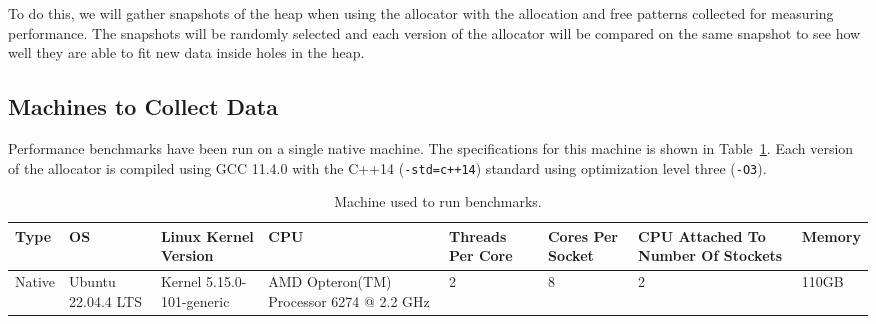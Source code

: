 To do this, we will gather snapshots of the heap when using the allocator with the allocation and free patterns collected for measuring performance. The snapshots will be randomly selected and each version of the allocator will be compared on the same snapshot to see how well they are able to fit new data inside holes in the heap.




\subsection{Machines to Collect Data}

Performance benchmarks have been run on a single native machine. The specifications for this machine is shown in Table~\ref{table:machine}. Each version of the allocator is compiled using GCC 11.4.0 with the C++14 (\texttt{-std=c++14}) standard using optimization level three (\texttt{-O3}).

\begin{table}[H]
\centering
\footnotesize
\begin{tabular}{p{1cm}p{2in}p{20mm}p{1cm}p{50pt}p{2cm}p{1cm}p{1cm}p{2cm}p{15mm}}
Type   & \multicolumn{3}{p{1cm}}{OS}                 & Linux Kernel Version      & CPU                                      & Threads Per Core & Cores Per Socket & CPU Attached To Number Of Stockets & Memory \\
\hline
Native & \multicolumn{3}{p{1cm}}{Ubuntu 22.04.4 LTS} & Kernel 5.15.0-101-generic & AMD Opteron(TM) Processor 6274 @ 2.2 GHz & 2                & 8                & 2                                  & 110GB 
\end{tabular}
\caption{Machine used to run benchmarks.}
\label{table:machine}
\end{table}



